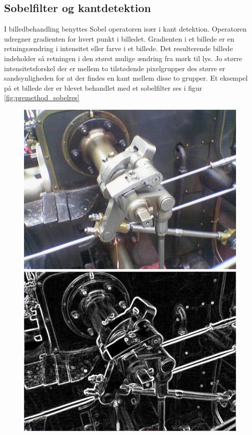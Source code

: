 \subsection{Sobelfilter og kantdetektion}
I billedbehandling benyttes Sobel operatoren især i kant detektion. Operatoren udregner gradienten for hvert punkt i billedet. Gradienten i et billede er en retningsændring i intensitet eller farve i et billede. Det resulterende billede indeholder så retningen i den størst mulige ændring fra mørk til lys. Jo større intensitetsforskel der er mellem to tilstødende pixelgrupper des større er sandsynligheden for at der findes en kant mellem disse to grupper. Et eksempel på et billede der er blevet behandlet med et sobelfilter ses i figur \ref{fig:premethod_sobelres}


\begin{figure}[H]
	\begin{minipage}[b]{0.5\linewidth}
		\centering
		\includegraphics[scale=0.25]{files/premethod/img/sobel1.PNG}
	\end{minipage}
	\hspace{0.5cm}
	\begin{minipage}[b]{0.5\linewidth}
		\centering
		\includegraphics[scale=0.25]{files/premethod/img/sobel2.PNG}

\end{minipage}
\end{figure}
